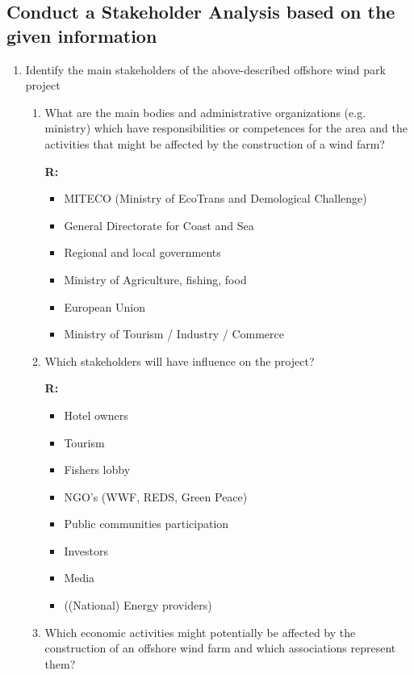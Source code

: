 \documentclass{article}
\begin{document}
\subsection*{Conduct a Stakeholder Analysis based on the given information}
\begin{enumerate}
    \item Identify the main stakeholders of the above-described offshore wind park
    project
    \begin{enumerate}[label=\alph*)]
        \item What are the main bodies and administrative organizations (e.g. ministry)
        which have responsibilities or competences for the area and the activities
        that might be affected by the construction of a wind farm?

        \textbf{R:}
        \begin{itemize}
            \item MITECO (Ministry of EcoTrans and Demological Challenge)
            \item General Directorate for Coast and Sea
            \item Regional and local governments
            \item Ministry of Agriculture, fishing, food
            \item European Union
            \item Ministry of Tourism / Industry / Commerce
        \end{itemize}

        \item Which stakeholders will have influence on the project?

        \textbf{R:}
        \begin{itemize}
            \item Hotel owners
            \item Tourism
            \item Fishers lobby
            \item NGO's (WWF, REDS, Green Peace)
            \item Public communities participation
            \item Investors
            \item Media
            \item ((National) Energy providers)
        \end{itemize}

        \item Which economic activities might potentially be affected by the construction
        of an offshore wind farm and which associations represent them?


\end{enumerate}
\end{enumerate}
\end{document}
